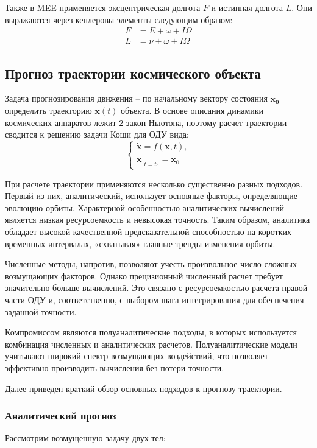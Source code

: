 Также в MEE применяется эксцентрическая долгота $F$ и истинная долгота $L$. 
Они выражаются через кеплеровы элементы следующим образом:
\begin{align*}
    F &= E + \omega + I \Omega \\
    L &= \nu + \omega + I \Omega
\end{align*}

\subsection{Прогноз траектории космического объекта}
Задача прогнозирования движения -- по начальному вектору состояния $\mathbf{x_0}$ определить траекторию $\mathbf{x}(t)$ объекта.
В основе описания динамики космических аппаратов лежит 2 закон Ньютона, 
поэтому расчет траектории сводится к решению задачи Коши для ОДУ вида:
\begin{equation}
    \begin{cases}
        \dot{\mathbf{x}} = f(\mathbf{x}, t), \\
        \mathbf{x} \big|_{t = t_0} = \mathbf{x_0}
        \label{eq:prognoz_task}
    \end{cases}
\end{equation}

При расчете траектории применяются несколько существенно разных подходов. 
Первый из них, аналитический, использует основные факторы, определяющие эволюцию орбиты.
Характерной особенностью аналитических вычислений является низкая ресурсоемкость и невысокая точность.
Таким образом, аналитика обладает высокой качественной предсказательной способностью на коротких временных интервалах, 
«схватывая» главные тренды изменения орбиты.

Численные методы, напротив, позволяют учесть произвольное число сложных возмущающих факторов.
Однако прецизионный численный расчет требует значительно больше вычислений. 
Это связано с ресурсоемкостью расчета правой части ОДУ и,
соответственно, с выбором шага интегрирования для обеспечения заданной точности.

Компромиссом являются полуаналитические подходы, 
в которых используется комбинация численных и аналитических расчетов.
Полуаналитические модели учитывают широкий спектр возмущающих воздействий, 
что позволяет эффективно производить вычисления без потери точности.

Далее приведен краткий обзор основных подходов к прогнозу траектории.

\subsubsection{Аналитический прогноз}
Рассмотрим возмущенную задачу двух тел:

